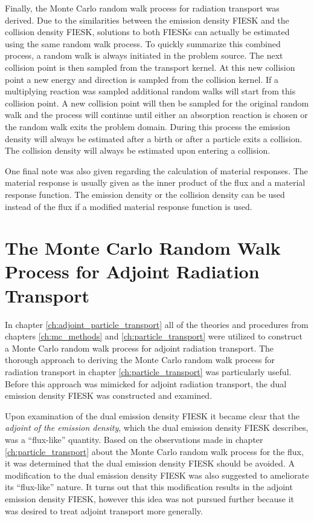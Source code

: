 Finally, the Monte Carlo random walk process for radiation transport was
derived. Due to the similarities between the emission density FIESK and the
collision density FIESK, solutions to both FIESKs can actually be estimated
using the same random walk process. To quickly summarize this combined process,
a random walk is always initiated in the problem source. The next collision 
point is then sampled from the transport kernel. At this new collision point
a new energy and direction is sampled from the collision kernel. If a
multiplying reaction was sampled additional random walks will start from this
collision point. A new collision point will then be sampled for the original
random walk and the process will continue until either an absorption reaction
is chosen or the random walk exits the problem domain. During this process
the emission density will always be estimated after a birth or after a particle
exits a collision. The collision density will always be estimated upon entering
a collision. 

One final note was also given regarding the calculation of material responses.
The material response is usually given as the inner product of the flux and a
material response function. The emission density or the collision density
can be used instead of the flux if a modified material response function is
used. 

\section{The Monte Carlo Random Walk Process for Adjoint Radiation Transport}
In chapter \ref{ch:adjoint_particle_transport} all of the theories and 
procedures from chapters \ref{ch:mc_methods} and \ref{ch:particle_transport}
were utilized to construct a Monte Carlo random walk process for adjoint
radiation transport. The thorough approach to deriving the Monte Carlo
random walk process for radiation transport in chapter 
\ref{ch:particle_transport} was particularly useful. Before this approach
was mimicked for adjoint radiation transport, the dual emission density
FIESK was constructed and examined.

Upon examination of the dual emission density FIESK it became clear that the 
\textit{adjoint of the emission density}, which the dual emission density
FIESK describes, was a ``flux-like'' quantity. Based on the observations
made in chapter \ref{ch:particle_transport} about the Monte Carlo random
walk process for the flux, it was determined that the dual emission density
FIESK should be avoided. A modification to the dual emission density FIESK was
also suggested to ameliorate its ``flux-like'' nature. It turns out that this
modification results in the adjoint emission density FIESK, however this idea
was not pursued further because it was desired to treat adjoint transport more
generally. 


